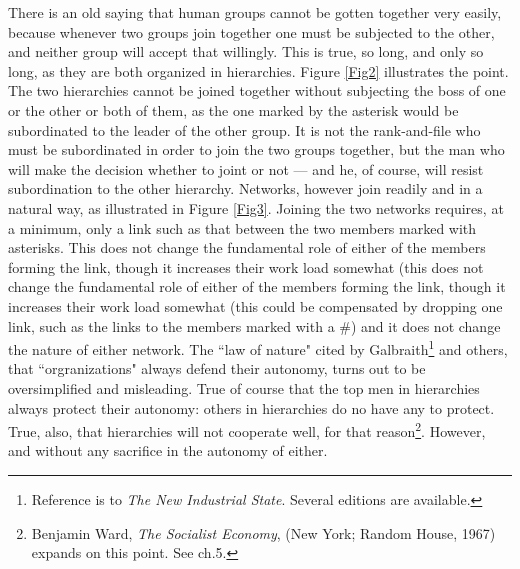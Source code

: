 There is an old saying that human groups cannot be gotten together very easily, because whenever two groups join together one must be subjected to the other, and neither group will accept that willingly. This is true, so long, and only so long, as they are both organized in hierarchies. Figure \ref{Fig2} illustrates the point. The two hierarchies cannot be joined together without subjecting the boss of one or the other or both of them, as the one marked by the asterisk would be subordinated to the leader of the other group. It is not the rank-and-file who must be subordinated in order to join the two groups together, but the man who will make the decision whether to joint or not --- and he, of course, will resist subordination to the other hierarchy. Networks, however join readily and in a natural way, as illustrated in Figure \ref{Fig3}. Joining the two networks requires, at a minimum, only a link such as that between the two members marked with asterisks. This does not change the fundamental role of either of the members forming the link, though it increases their work load somewhat (this does not change the fundamental role of either of the members forming the link, though it increases their work load somewhat (this could be compensated by dropping one link, such as the links to the members marked with a \#) and it does not change the nature of either network. The ``law of nature" cited by Galbraith\footnote{Reference is to \emph{The New Industrial State}. Several editions are available.} and others, that ``orgranizations" always defend their autonomy, turns out to be oversimplified and misleading. True of course that the top men in hierarchies always protect their autonomy: others in hierarchies do no have any to protect. True, also, that hierarchies will not cooperate well, for that reason\footnote{Benjamin Ward, \emph{The Socialist Economy}, (New York; Random House, 1967) expands on this point. See ch.5.}. However, and without any sacrifice in the autonomy of either.\\
